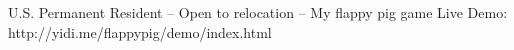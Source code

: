 \documentclass{resume} %
\begin{document}








U.S. Permanent Resident -- Open to relocation -- My flappy pig game Live Demo: http://yidi.me/flappypig/demo/index.html \\
\end{document}
